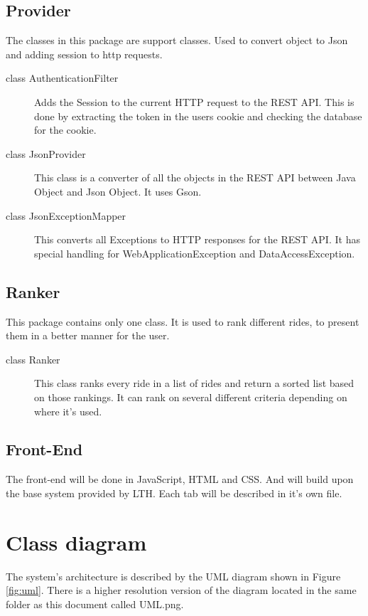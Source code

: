 \documentclass{article}
\begin{document}
\subsection{Provider}

The classes in this package are support classes. Used to convert object to Json and adding session to http requests.

\begin{description}
    \item[class AuthenticationFilter] Adds the Session to the current HTTP request to the REST API. This is done by extracting the token in the users cookie and checking the database for the cookie.
    \item[class JsonProvider] This class is a converter of all the objects in the REST API between Java Object and Json Object. It uses Gson.
    \item[class JsonExceptionMapper] This converts all Exceptions to HTTP responses for the REST API. It has special handling for WebApplicationException and DataAccessException.
\end{description}

\subsection{Ranker}

This package contains only one class. It is used to rank different rides, to present them in a better manner for the user.

\begin{description}
    \item[class Ranker] This class ranks every ride in a list of rides and return a sorted list based on those rankings. It can rank on several different criteria depending on where it's used.
\end{description}

\subsection{Front-End}

The front-end will be done in JavaScript, HTML and CSS. And will build upon the base system provided by LTH. Each tab will be described in it's own file. 

\section{Class diagram}
The system's architecture is described by the UML diagram shown in Figure \ref{fig:uml}.
There is a higher resolution version of the diagram located in the same folder as this document called UML.png.
\end{document}
